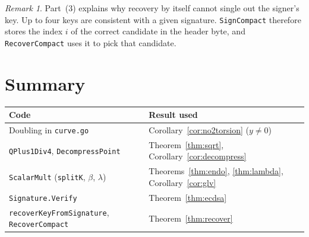 \documentclass[11pt]{article}
\theoremstyle{definition}
\theoremstyle{remark}
\newtheorem{remark}[theorem]{Remark}
\begin{document}
\begin{remark}
Part~(3) explains why recovery by itself cannot single out the signer's key.
Up to four keys are consistent with a given signature. \texttt{SignCompact}
therefore stores the index $i$ of the correct candidate in the header byte,
and \texttt{RecoverCompact} uses it to pick that candidate.
\end{remark}

\section*{Summary}

\begin{center}
\begin{tabular}{ll}
\hline
Code & Result used \\
\hline
Doubling in \texttt{curve.go} & Corollary~\ref{cor:no2torsion} ($y\ne0$) \\
\texttt{QPlus1Div4}, \texttt{DecompressPoint} & Theorem~\ref{thm:sqrt}, Corollary~\ref{cor:decompress} \\
\texttt{ScalarMult} (\texttt{splitK}, $\beta$, $\lambda$) & Theorems~\ref{thm:endo}, \ref{thm:lambda}, Corollary~\ref{cor:glv} \\
\texttt{Signature.Verify} & Theorem~\ref{thm:ecdsa} \\
\texttt{recoverKeyFromSignature}, \texttt{RecoverCompact} & Theorem~\ref{thm:recover} \\
\hline
\end{tabular}
\end{center}
\end{document}
